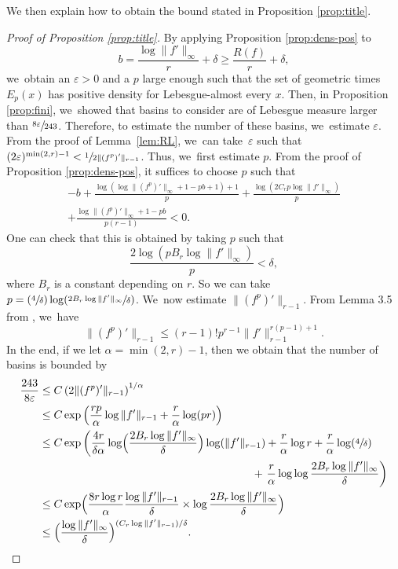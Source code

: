 \documentclass[10pt]{amsart}
\newcommand{\Psfrac}[2]{(\sfrac{#1}{#2})}
\theoremstyle{definition}
\begin{document}
We then explain how to obtain the bound stated in Proposition \ref{prop:title}.\enlargethispage{-2\baselineskip}

\begin{proof}[Proof of Proposition \ref{prop:title}]
By applying Proposition \ref{prop:dens-pos} to
\[
b = \frac{\log \| f' \|_{\infty}}{r} + \delta \geq \frac{R(f)}{r} + \delta,
\]
we~obtain an $\varepsilon > 0$ and a $p$ large enough such that the set of geometric times $E_p(x)$ has positive density for Lebesgue-almost every $x$.
Then, in Proposition \ref{prop:fini}, we~showed that basins to consider are of Lebesgue measure larger than $\sfrac{8 \varepsilon}{243}$.
Therefore, to estimate the number of these basins, we~estimate $\varepsilon$.
From the proof of Lemma~\ref{lem:RL}, we~can take~$\varepsilon$ such that $(2 \varepsilon)^{\min(2,r) - 1} < \sfrac{1}{2 \| (f^p)' \|_{r-1}}$.
Thus, we~first estimate $p$.
From the proof of Proposition \ref{prop:dens-pos}, it suffices to choose $p$ such that
\begin{multline*}
-b + \frac{\log(\log \| (f^p)' \|_{\infty} + 1 - pb+1)+1}{p} + \frac{\log(2 C_r p \log \| f' \|_{\infty})}{p}\\
+ \frac{\log \| (f^p)' \|_{\infty} + 1 - pb}{p(r-1)} < 0.
\end{multline*}
One can check that this is obtained by taking $p$ such that
\[
\frac{2\log(p B_r \log \| f' \|_{\infty})}{p} < \delta,
\]
where $B_r$ is a constant depending on $r$.
So we can take $p = \Psfrac{4}{\delta} \log \Psfrac{2 B_r \log \| f' \|_{\infty}}{\delta}$. We~now estimate $\| (f^p)' \|_{r-1}$.
From Lemma 3.5 from \cite{MR3384516}, we~have
\[
\| (f^p)' \|_{r-1} \leq (r-1)! p^{r-1} \| f' \|_{r-1}^{r(p-1) +1 }.
\]
In the end, if we let $\alpha = \min(2,r)-1$, then we obtain that the number of basins is bounded by
\begin{align*}
\frac{243}{8 \varepsilon} &\leq C \left (2 \| (f^p)' \|_{r-1} \right)^{1/\alpha}\\
&\leq C \exp \left (\frac{rp}{\alpha} \log \| f' \|_{r-1} + \frac{r}{\alpha} \log (pr) \right)\\
&\leq C \exp \left (\frac{4r}{\delta \alpha} \log \Bigl (\frac{2 B_r \log \| f' \|_{\infty}}{\delta} \Bigr) \log (\| f' \|_{r-1}) + \frac{r}{\alpha} \log r + \frac{r}{\alpha} \log \Psfrac {4}{\delta} \right.\\
&\hspace{6.8cm}+ \left. \frac{r}{\alpha} \log \log \frac{2 B_r \log \| f' \|_{\infty}}{\delta} \right)\\
&\leq C \exp \Bigl (\frac{8 r \log r}{\alpha} \frac{\log \| f' \|_{r-1}}{\delta} \times \log \frac{2 B_r \log \| f' \|_{\infty}}{\delta} \Bigr)\\
&\leq \Bigl (\frac{\log \| f' \|_{\infty}}{\delta} \Bigr)^{ (C_r \log \| f' \|_{r-1}) / \delta }.\qedhere
\end{align*}
\end{proof}
\end{document}
